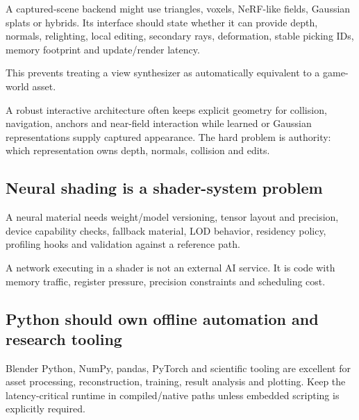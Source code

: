 \hypertarget{06-engine-ii-ch042-neural-graphics-should-enter-the-engine-through-capability-contracts}{}

A captured-scene backend might use triangles, voxels, NeRF-like fields, Gaussian splats or hybrids. Its interface should state whether it can provide depth, normals, relighting, local editing, secondary rays, deformation, stable picking IDs, memory footprint and update/render latency.

This prevents treating a view synthesizer as automatically equivalent to a game-world asset.

A robust interactive architecture often keeps explicit geometry for collision, navigation, anchors and near-field interaction while learned or Gaussian representations supply captured appearance. The hard problem is authority: which representation owns depth, normals, collision and edits.

\subsection{Neural shading is a shader-system problem}\label{06-engine-ii-ch042-neural-shading-is-a-shader-system-problem}

\hypertarget{06-engine-ii-ch042-neural-shading-is-a-shader-system-problem}{}

A neural material needs weight/model versioning, tensor layout and precision, device capability checks, fallback material, LOD behavior, residency policy, profiling hooks and validation against a reference path.

A network executing in a shader is not an external AI service. It is code with memory traffic, register pressure, precision constraints and scheduling cost.

\subsection{Python should own offline automation and research tooling}\label{06-engine-ii-ch042-python-should-own-offline-automation-and-research-tooling}

\hypertarget{06-engine-ii-ch042-python-should-own-offline-automation-and-research-tooling}{}

Blender Python, NumPy, pandas, PyTorch and scientific tooling are excellent for asset processing, reconstruction, training, result analysis and plotting. Keep the latency-critical runtime in compiled/native paths unless embedded scripting is explicitly required.

